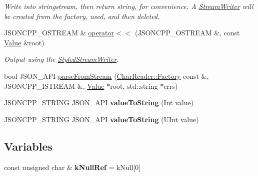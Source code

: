 \begin{DoxyCompactItemize}
\begin{DoxyCompactList}\small\item\em Write into stringstream, then return string, for convenience. A \hyperlink{class_json_1_1_stream_writer}{Stream\+Writer} will be created from the factory, used, and then deleted. \end{DoxyCompactList}\item 
J\+S\+O\+N\+C\+P\+P\+\_\+\+O\+S\+T\+R\+E\+AM \& \hyperlink{namespace_json_a845a15902e500af8eee19e729a17b863}{operator$<$$<$} (J\+S\+O\+N\+C\+P\+P\+\_\+\+O\+S\+T\+R\+E\+AM \&, const \hyperlink{class_json_1_1_value}{Value} \&root)
\begin{DoxyCompactList}\small\item\em Output using the \hyperlink{class_json_1_1_styled_stream_writer}{Styled\+Stream\+Writer}. \end{DoxyCompactList}\item 
bool J\+S\+O\+N\+\_\+\+A\+PI \hyperlink{namespace_json_aab0cf1ecf81d1aeca12be2a416a84352}{parse\+From\+Stream} (\hyperlink{class_json_1_1_char_reader_1_1_factory}{Char\+Reader\+::\+Factory} const \&, J\+S\+O\+N\+C\+P\+P\+\_\+\+I\+S\+T\+R\+E\+AM \&, \hyperlink{class_json_1_1_value}{Value} $\ast$root, std\+::string $\ast$errs)
\item 
J\+S\+O\+N\+C\+P\+P\+\_\+\+S\+T\+R\+I\+NG J\+S\+O\+N\+\_\+\+A\+PI {\bfseries value\+To\+String} (Int value)\hypertarget{namespace_json_a4ed9732688b3c3dcaec309c9baddeac9}{}\label{namespace_json_a4ed9732688b3c3dcaec309c9baddeac9}

\item 
J\+S\+O\+N\+C\+P\+P\+\_\+\+S\+T\+R\+I\+NG J\+S\+O\+N\+\_\+\+A\+PI {\bfseries value\+To\+String} (U\+Int value)\hypertarget{namespace_json_a99bc401be7f8a09a8439f3e7219b1f12}{}\label{namespace_json_a99bc401be7f8a09a8439f3e7219b1f12}

\end{DoxyCompactItemize}
\subsection*{Variables}
\begin{DoxyCompactItemize}
\item 
const unsigned char \& {\bfseries k\+Null\+Ref} = k\+Null\mbox{[}0\mbox{]}\hypertarget{namespace_json_ab30055b4bbd82aecaca57ccecd63bbe6}{}\label{namespace_json_ab30055b4bbd82aecaca57ccecd63bbe6}

\end{DoxyCompactItemize}


